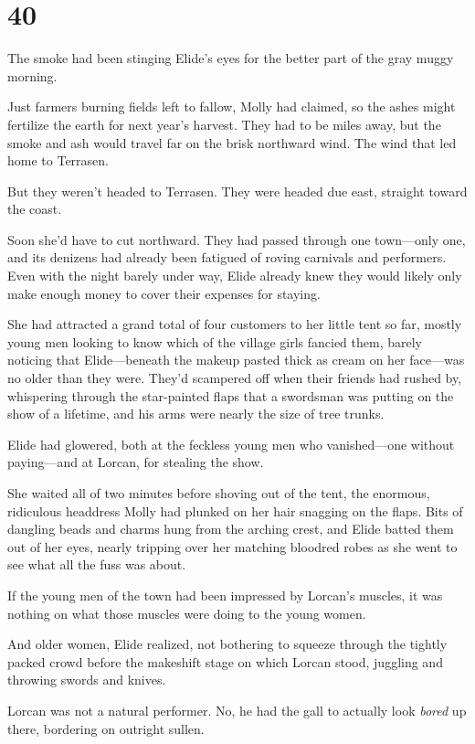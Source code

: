 
\chapter{40}

The smoke had been stinging Elide's eyes for the better part of the gray muggy morning.

Just farmers burning fields left to fallow, Molly had claimed, so the ashes might fertilize the earth for next year's harvest.
They had to be miles away, but the smoke and ash would travel far on the brisk northward wind.
The wind that led home to Terrasen.

But they weren't headed to Terrasen.
They were headed due east, straight toward the coast.

Soon she'd have to cut northward.
They had passed through one town---only one, and its denizens had already been fatigued of roving carnivals and performers.
Even with the night barely under way, Elide already knew they would likely only make enough money to cover their expenses for staying.

She had attracted a grand total of four customers to her little tent so far, mostly young men looking to know which of the village girls fancied them, barely noticing that Elide---beneath the makeup pasted thick as cream on her face---was no older than they were.
They'd scampered off when their friends had rushed by, whispering through the star-painted flaps that a swordsman was putting on the show of a lifetime, and his arms were nearly the size of tree trunks.

Elide had glowered, both at the feckless young men who vanished---one without paying---and at Lorcan, for stealing the show.

She waited all of two minutes before shoving out of the tent, the enormous, ridiculous headdress Molly had plunked on her hair snagging on the flaps.
Bits of dangling beads and charms hung from the arching crest, and Elide batted them out of her eyes, nearly tripping over her matching bloodred robes as she went to see what all the fuss was about.

If the young men of the town had been impressed by Lorcan's muscles, it was nothing on what those muscles were doing to the young women.

And older women, Elide realized, not bothering to squeeze through the tightly packed crowd before the makeshift stage on which Lorcan stood, juggling and throwing swords and knives.

Lorcan was not a natural performer.
No, he had the gall to actually look \emph{bored} up there, bordering on outright sullen.

